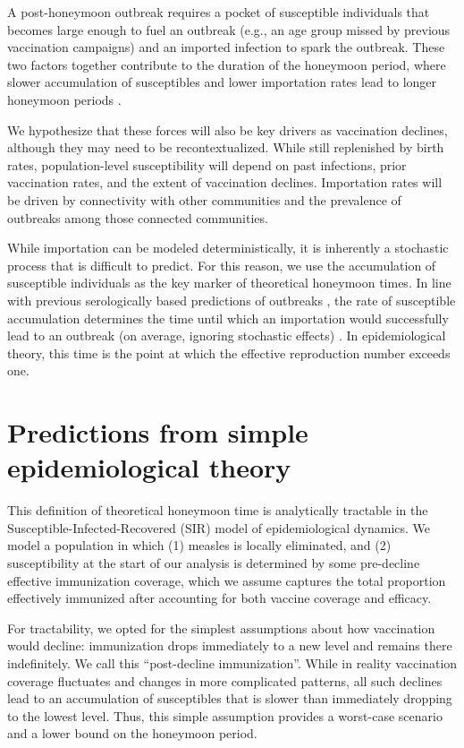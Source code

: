 A post-honeymoon outbreak requires a pocket of susceptible individuals that becomes large enough to fuel an outbreak (e.g., an age group missed by previous vaccination campaigns) and an imported infection to spark the outbreak. These two factors together contribute to the duration of the honeymoon period, where slower accumulation of susceptibles and lower importation rates lead to longer honeymoon periods \citep{McLeanAnderson1988,MetcalfEtAl2020}.

We hypothesize that these forces will also be key drivers as vaccination declines, although they may need to be recontextualized. While still replenished by birth rates, population-level susceptibility will depend on past infections, prior vaccination rates, and the extent of vaccination declines. Importation rates will be driven by connectivity with other communities and the prevalence of outbreaks among those connected communities.

While importation can be modeled deterministically, it is inherently a stochastic process that is difficult to predict. For this reason, we use the accumulation of susceptible individuals as the key marker of theoretical honeymoon times. In line with previous serologically based predictions of outbreaks \citep{ChenEtAl1990,GayEtAl1995,WinterEtAl2018,MetcalfEtAl2020}, the rate of susceptible accumulation determines the time until which an importation would successfully lead to an outbreak (on average, ignoring stochastic effects) \citep{BjornstadEtAl2002}. In epidemiological theory, this time is the point at which the effective reproduction number exceeds one.

\section{Predictions from simple epidemiological theory}
\label{sec:simple-theory}

This definition of theoretical honeymoon time is analytically tractable in the Susceptible-Infected-Recovered (SIR) model of epidemiological dynamics. We model a population in which (1) measles is locally eliminated, and (2) susceptibility at the start of our analysis is determined by some pre-decline effective immunization coverage, which we assume captures the total proportion effectively immunized after accounting for both vaccine coverage and efficacy.

For tractability, we opted for the simplest assumptions about how vaccination would decline: immunization drops immediately to a new level and remains there indefinitely. We call this ``post-decline immunization''. While in reality vaccination coverage fluctuates and changes in more complicated patterns, all such declines lead to an accumulation of susceptibles that is slower than immediately dropping to the lowest level. Thus, this simple assumption provides a worst-case scenario and a lower bound on the honeymoon period.

